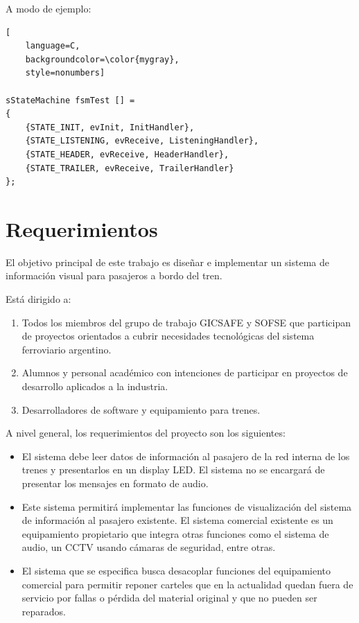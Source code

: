 A modo de ejemplo:

\begin{lstlisting}[
	language=C, 
	backgroundcolor=\color{mygray},
	style=nonumbers]

sStateMachine fsmTest [] = 
{
	{STATE_INIT, evInit, InitHandler},
	{STATE_LISTENING, evReceive, ListeningHandler},
	{STATE_HEADER, evReceive, HeaderHandler},
	{STATE_TRAILER, evReceive, TrailerHandler}
};
\end{lstlisting}
    


\section{Requerimientos}

 El objetivo principal de este trabajo es diseñar e implementar un sistema de información visual
para pasajeros a bordo del tren. 

Está dirigido a:
\begin{enumerate}
\item Todos los  miembros del grupo de trabajo GICSAFE y SOFSE que participan de proyectos orientados a cubrir necesidades tecnológicas del sistema ferroviario argentino.
\item Alumnos y personal académico con intenciones de participar en proyectos de desarrollo aplicados a la industria.
\item Desarrolladores de software y equipamiento para trenes.
\end{enumerate}

A nivel general, los requerimientos del proyecto son los siguientes:

\begin{itemize}

\item El sistema debe leer datos de información al pasajero de la red interna de los trenes y presentarlos en un display LED. El sistema no se encargará de presentar los mensajes en formato de audio.

\item Este sistema permitirá implementar las funciones de visualización del sistema de información al pasajero existente. El sistema comercial existente es un equipamiento propietario que integra otras funciones como el sistema de audio, un CCTV usando cámaras de seguridad, entre otras. 

\item El sistema que se especifica busca desacoplar funciones del equipamiento comercial para permitir reponer carteles que en la actualidad quedan fuera de servicio por fallas o pérdida del material original y que no pueden ser reparados. 

\end{itemize}

